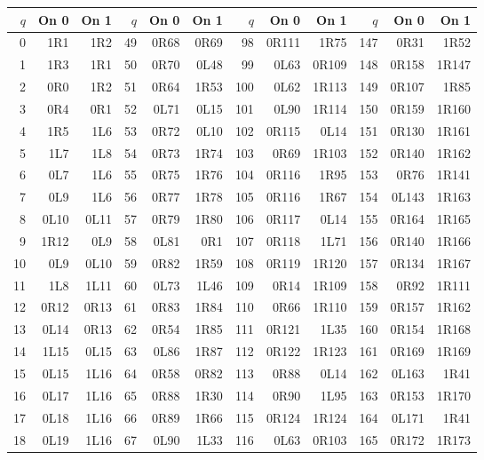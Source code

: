 \begin{center}
\begin{tabular}{rrr@{\hspace{7mm}}rrr@{\hspace{7mm}}rrr@{\hspace{7mm}}rrr}
\toprule
$q$ & On 0 & On 1 & $q$ & On 0 & On 1 & $q$ & On 0 & On 1 & $q$ & On 0 & On 1 \\
\midrule
0 & 1R1 & 1R2 & 49 & 0R68 & 0R69 & 98 & 0R111 & 1R75 & 147 & 0R31 & 1R52 \\
1 & 1R3 & 1R1 & 50 & 0R70 & 0L48 & 99 & 0L63 & 0R109 & 148 & 0R158 & 1R147 \\
2 & 0R0 & 1R2 & 51 & 0R64 & 1R53 & 100 & 0L62 & 1R113 & 149 & 0R107 & 1R85 \\
3 & 0R4 & 0R1 & 52 & 0L71 & 0L15 & 101 & 0L90 & 1R114 & 150 & 0R159 & 1R160 \\
4 & 1R5 & 1L6 & 53 & 0R72 & 0L10 & 102 & 0R115 & 0L14 & 151 & 0R130 & 1R161 \\
5 & 1L7 & 1L8 & 54 & 0R73 & 1R74 & 103 & 0R69 & 1R103 & 152 & 0R140 & 1R162 \\
6 & 0L7 & 1L6 & 55 & 0R75 & 1R76 & 104 & 0R116 & 1R95 & 153 & 0R76 & 1R141 \\
7 & 0L9 & 1L6 & 56 & 0R77 & 1R78 & 105 & 0R116 & 1R67 & 154 & 0L143 & 1R163 \\
8 & 0L10 & 0L11 & 57 & 0R79 & 1R80 & 106 & 0R117 & 0L14 & 155 & 0R164 & 1R165 \\
9 & 1R12 & 0L9 & 58 & 0L81 & 0R1 & 107 & 0R118 & 1L71 & 156 & 0R140 & 1R166 \\
10 & 0L9 & 0L10 & 59 & 0R82 & 1R59 & 108 & 0R119 & 1R120 & 157 & 0R134 & 1R167 \\
11 & 1L8 & 1L11 & 60 & 0L73 & 1L46 & 109 & 0R14 & 1R109 & 158 & 0R92 & 1R111 \\
12 & 0R12 & 0R13 & 61 & 0R83 & 1R84 & 110 & 0R66 & 1R110 & 159 & 0R157 & 1R162 \\
13 & 0L14 & 0R13 & 62 & 0R54 & 1R85 & 111 & 0R121 & 1L35 & 160 & 0R154 & 1R168 \\
14 & 1L15 & 0L15 & 63 & 0L86 & 1R87 & 112 & 0R122 & 1R123 & 161 & 0R169 & 1R169 \\
15 & 0L15 & 1L16 & 64 & 0R58 & 0R82 & 113 & 0R88 & 0L14 & 162 & 0L163 & 1R41 \\
16 & 0L17 & 1L16 & 65 & 0R88 & 1R30 & 114 & 0R90 & 1L95 & 163 & 0R153 & 1R170 \\
17 & 0L18 & 1L16 & 66 & 0R89 & 1R66 & 115 & 0R124 & 1R124 & 164 & 0L171 & 1R41 \\
18 & 0L19 & 1L16 & 67 & 0L90 & 1L33 & 116 & 0L63 & 0R103 & 165 & 0R172 & 1R173 \\

\end{tabular}
\end{center}
